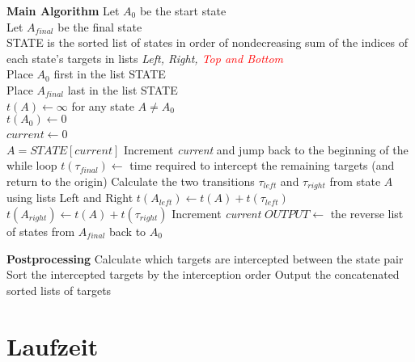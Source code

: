 \documentclass{scrartcl}
\begin{document}
\begin{minipage}{1\linewidth}
\begin{algorithm}[H]
\begin{algorithmic}

\State \textbf{Main Algorithm}
\State Let $A_0$ be the start state \\
Let $A_{final}$ be the final state \\
STATE is the sorted list of states in order of nondecreasing sum of the indices of each state’s targets in lists \emph{Left, Right, \textcolor{red}{Top and Bottom}} \\
Place $A_0$ first in the list STATE \\
Place $A_{final}$ last in the list STATE \\
$t(A) \leftarrow \infty$ for any state $A\neq A_0$  \\
$t(A_0)\leftarrow0 $\\
$current \leftarrow 0$
~\\
\State $A=STATE[current]$
\State Increment \emph{current} and jump back to the beginning of the while loop
\EndIf
{}
\State $t(\tau_{final})\leftarrow$ time required to intercept the remaining targets (and return to the 
\State origin)
\Else
\State Calculate the two transitions $\tau_{left}$ and $\tau_{right}$ from state $A$ using lists Left and Right
\State $t(A_{left}) \leftarrow t(A) + t(\tau_{left})$
\EndIf
{}
\State $t(A_{right}) \leftarrow t(A) + t(\tau_{right})$
\EndIf
\EndIf
\State Increment \emph{current}
\EndWhile
\State $OUTPUT \leftarrow$ the reverse list of states from $A_{final}$ back to $A_0$

\end{algorithmic}
\end{algorithm}
\end{minipage}

\begin{minipage}{1\linewidth}
\begin{algorithm}[H]
\begin{algorithmic}

\State \textbf{Postprocessing}
\State Calculate which targets are intercepted between the state pair 
\State Sort the intercepted targets by the interception order
\EndFor
\State Output the concatenated sorted lists of targets

\end{algorithmic}
\end{algorithm}
\end{minipage}

\section*{Laufzeit}
\end{document}
